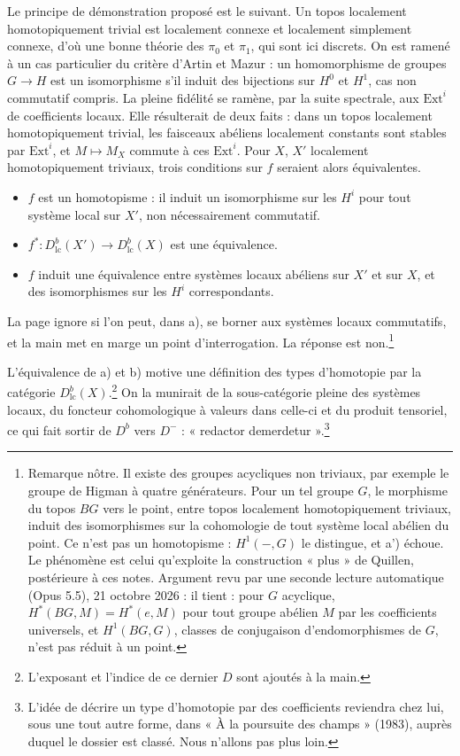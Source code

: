 \documentclass[11pt,a4paper]{article}
\begin{document}
Le principe de démonstration proposé est le suivant. Un topos localement
homotopiquement trivial est localement connexe et localement simplement
connexe, d'où une bonne théorie des $\pi_0$ et $\pi_1$, qui sont ici discrets.
On est ramené à un cas particulier du critère d'Artin et Mazur : un
homomorphisme de groupes $G \to H$ est un isomorphisme s'il induit des
bijections sur $H^{0}$ et $H^{1}$, cas non commutatif compris. La pleine
fidélité se ramène, par la suite spectrale, aux $\mathrm{Ext}^{i}$ de
coefficients locaux. Elle résulterait de deux faits : dans un topos localement
homotopiquement trivial, les faisceaux abéliens localement constants sont
stables par $\mathrm{Ext}^{i}$, et $M \mapsto M_X$ commute à ces
$\mathrm{Ext}^{i}$. Pour $X$, $X'$ localement homotopiquement triviaux, trois
conditions sur $f$ seraient alors équivalentes.
\begin{itemize}
  \item[a)] $f$ est un homotopisme : il induit un isomorphisme sur les $H^{i}$
  pour tout système local sur $X'$, non nécessairement commutatif.
  \item[b)] $f^{*} : D^{b}_{\mathrm{lc}}(X') \to D^{b}_{\mathrm{lc}}(X)$ est une
  équivalence.
  \item[a')] $f$ induit une équivalence entre systèmes locaux abéliens sur $X'$
  et sur $X$, et des isomorphismes sur les $H^{i}$ correspondants.
\end{itemize}
La page ignore si l'on peut, dans a), se borner aux systèmes locaux
commutatifs, et la main met en marge un point d'interrogation. La réponse est
non.\footnote{Remarque nôtre. Il existe des groupes acycliques non triviaux,
par exemple le groupe de Higman à quatre générateurs. Pour un tel groupe $G$,
le morphisme du topos $BG$ vers le point, entre topos localement
homotopiquement triviaux, induit des isomorphismes sur la cohomologie de tout
système local abélien du point. Ce n'est pas un homotopisme : $H^{1}(-, G)$ le
distingue, et a') échoue. Le phénomène est celui qu'exploite la construction
« plus » de Quillen, postérieure à ces notes. Argument revu par une seconde lecture automatique (Opus 5.5), 21 octobre 2026 : il tient : pour $G$ acyclique, $H^{*}(BG, M) = H^{*}(e, M)$ pour tout groupe abélien $M$ par les coefficients universels, et $H^{1}(BG, G)$, classes de conjugaison d'endomorphismes de $G$, n'est pas réduit à un point.}

L'équivalence de a) et b) motive une définition des types d'homotopie par la
catégorie $D^{b}_{\mathrm{lc}}(X)$.\footnote{L'exposant et l'indice de ce
dernier $D$ sont ajoutés à la main.} On la munirait de la sous-catégorie pleine
des systèmes locaux, du foncteur cohomologique à valeurs dans celle-ci et du
produit tensoriel, ce qui fait sortir de $D^{b}$ vers $D^{-}$ : « redactor
demerdetur ».\footnote{L'idée de décrire un type d'homotopie par des
coefficients reviendra chez lui, sous une tout autre forme, dans « À la
poursuite des champs » (1983), auprès duquel le dossier est classé. Nous
n'allons pas plus loin.}
\end{document}
